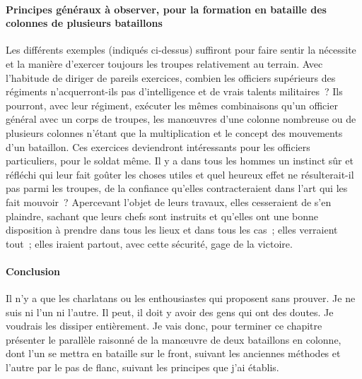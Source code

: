 \documentclass[french,twoside]{book} %
\begin{document}
\paragraph[{Principes généraux à observer, pour la formation en bataille des colonnes de plusieurs bataillons}]{Principes généraux à observer, pour la formation en bataille des colonnes de plusieurs bataillons}
\noindent […]\par
Les différents exemples (indiqués ci-dessus) suffiront pour faire sentir la nécessite et la manière d’exercer toujours les troupes relativement au terrain. Avec l’habitude de diriger de pareils exercices, combien les officiers supérieurs des régiments n’acquerront-ils pas d’intelligence et de vrais talents militaires ? Ils pourront, avec leur régiment, exécuter les mêmes combinaisons qu’un officier général avec un corps de troupes, les manœuvres d’une colonne nombreuse ou de plusieurs colonnes n’étant que la multiplication et le concept des mouvements d’un bataillon. Ces exercices deviendront intéressants pour les officiers particuliers, pour le soldat même. Il y a dans tous les hommes un instinct sûr et réfléchi qui leur fait goûter les choses utiles et quel heureux effet ne résulterait-il pas parmi les troupes, de la confiance qu’elles contracteraient dans l’art qui les fait mouvoir ? Apercevant l’objet de leurs travaux, elles cesseraient de s’en plaindre, sachant que leurs chefs sont instruits et qu’elles ont une bonne disposition à prendre dans tous les lieux et dans tous les cas ; elles verraient tout ; elles iraient partout, avec cette sécurité, gage de la victoire.
\paragraph[{Conclusion}]{Conclusion}
\noindent Il n’y a que les charlatans ou les enthousiastes qui proposent sans prouver. Je ne suis ni l’un ni l’autre. Il peut, il doit y avoir des gens qui ont des doutes. Je voudrais les dissiper entièrement. Je vais donc, pour terminer ce chapitre présenter le parallèle raisonné de la manœuvre de deux bataillons en colonne, dont l’un se mettra en bataille sur le front, suivant les anciennes méthodes et l’autre par le pas de flanc, suivant les principes que j’ai établis.
\end{document}
